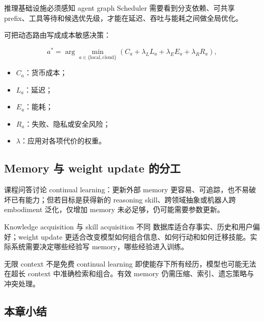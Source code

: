 \documentclass[a4paper]{article}
\begin{document}
\begin{importantbox}{推理基础设施必须感知 agent graph}
Scheduler 需要看到分支依赖、可共享 prefix、工具等待和候选优先级，才能在延迟、吞吐与能耗之间做全局优化。
\end{importantbox}


可把动态路由写成成本敏感决策：

$$
a^*=\arg\min_{a\in\{\text{local},\text{cloud}\}}
\left(C_a+\lambda_L L_a+\lambda_E E_a+\lambda_R R_a\right),
$$

\begin{itemize}
    \item $C_a$：货币成本；
    \item $L_a$：延迟；
    \item $E_a$：能耗；
    \item $R_a$：失败、隐私或安全风险；
    \item $\lambda$：应用对各项代价的权重。
\end{itemize}

\subsection{Memory 与 weight update 的分工}

课程问答讨论 continual learning：更新外部 memory 更容易、可追踪，也不易破坏已有能力；但若目标是获得新的 reasoning skill、跨领域抽象或机器人跨 embodiment 泛化，仅增加 memory 未必足够，仍可能需要参数更新。

\begin{knowledgebox}{Knowledge acquisition 与 skill acquisition 不同}
数据库适合存事实、历史和用户偏好；weight update 更适合改变模型如何组合信息、如何行动和如何迁移技能。实际系统需要决定哪些经验写 memory，哪些经验进入训练。
\end{knowledgebox}

\begin{warningbox}{无限 context 不是免费 continual learning}
即使能存下所有经历，模型也可能无法在超长 context 中准确检索和组合。有效 memory 仍需压缩、索引、遗忘策略与冲突处理。
\end{warningbox}

\subsection{本章小结}
\end{document}
